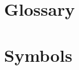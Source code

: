 \documentclass{book}
\begin{document}
\appendix{}
\cleardoublepage{}



\chapter{Glossary}

\chapter{Symbols}
\end{document}
